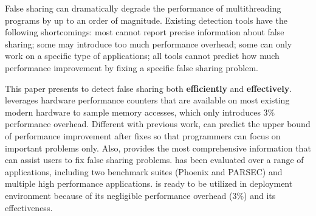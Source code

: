 False sharing can dramatically degrade the performance of multithreading programs by up to an order of magnitude. 
Existing detection tools have the following shortcomings: most cannot report precise information about false sharing; some may introduce too much performance overhead; some can only work on a specific type of applications; all tools cannot predict how much performance improvement by fixing a specific false sharing problem. 

This paper presents \cheetah{} to detect false sharing both {\bf efficiently} and {\bf effectively}. \cheetah{} leverages hardware performance counters that are available on most existing modern hardware to sample memory accesses, which only introduces 3\% performance overhead. Different with previous work, \cheetah{} can predict the upper bound of performance improvement after fixes so that programmers can focus on important problems only. Also, \cheetah{} provides the most comprehensive information that can assist users to fix false sharing problems. \cheetah{} has been evaluated over a range of applications, including two benchmark suites (Phoenix and PARSEC) and multiple high performance applications. \Cheetah{} is ready to be utilized in deployment environment because of its negligible performance overhead (3\%) and its effectiveness.  